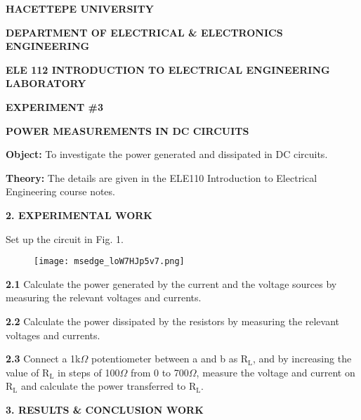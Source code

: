 \documentclass{article}
\begin{document}
\large

{\small \textbf{HACETTEPE UNIVERSITY}}

{\small \textbf{DEPARTMENT OF ELECTRICAL \& ELECTRONICS ENGINEERING}} 

{\small \textbf{ELE 112 INTRODUCTION TO ELECTRICAL ENGINEERING LABORATORY}} 

\vspace{4mm}

{\small \textbf{EXPERIMENT \#3}}

\vspace{4mm}

{\small \textbf{POWER MEASUREMENTS IN DC CIRCUITS}}

\vspace{4mm}

{\textbf{Object:}}
{To investigate the power generated and dissipated in DC circuits.}

\vspace{4mm}

{\textbf{Theory:}}
{The details are given in the ELE110 Introduction to Electrical Engineering course notes.}

\vspace{4mm}

{\Large \textbf{2. EXPERIMENTAL WORK}}

\vspace{4mm}

{Set up the circuit in Fig. 1.}

\begin{figure}[H]
    \centering
    \texttt{[image: msedge\_loW7HJp5v7.png]}
\end{figure}

{\textbf{2.1} Calculate the power generated by the current and the voltage sources by measuring the relevant voltages and currents.}

{\textbf{2.2} Calculate the power dissipated by the resistors by measuring the relevant voltages and currents.}

{\textbf{2.3} Connect a 1k$\Omega$ potentiometer between a and b as R$_{\text{L}}$, and by increasing the value of R$_{\text{L}}$ in steps of 100$\Omega$ from 0 to 700$\Omega$, measure the voltage and current on R$_{\text{L}}$ and calculate the power transferred to R$_{\text{L}}$.}

\vspace{4mm}

{\Large \textbf{3. RESULTS \& CONCLUSION WORK}}

\vspace{4mm}
\end{document}
